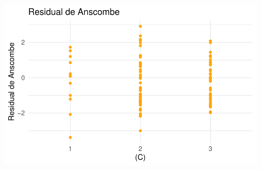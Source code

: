 \documentclass[
  letterpaper,
  DIV=11,
  numbers=noendperiod]{scrartcl}
\begin{document}
\begin{figure}
%
\begin{minipage}{0.50\linewidth}
\includegraphics{Modelos_files/figure-pdf/unnamed-chunk-30-4.pdf}\end{minipage}%

\end{figure}%
\end{document}
